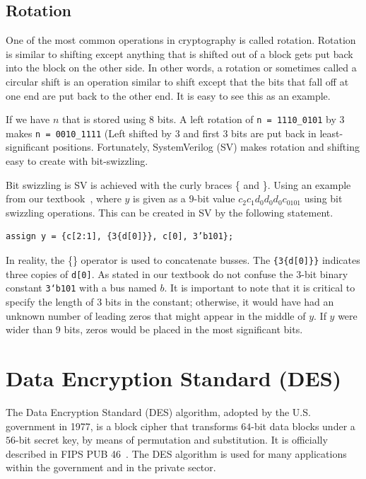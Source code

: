 \documentclass{article}
\begin{document}
\subsection{Rotation}

One of the most common operations in cryptography is called rotation.
Rotation is similar to shifting except anything that is shifted out of
a block gets put back into the block on the other side.  In other
words, a rotation or sometimes called a circular shift is an operation
similar to shift except that the bits that fall off at one end are put
back to the other end.  It is easy to see this as an example.

If we have $n$ that is stored using $8$ bits.
A left rotation of \verb!n = 1110_0101! by $3$ makes
\verb!n = 0010_1111! (Left shifted by 3 and first 3 bits are put back
in least-significant positions.  Fortunately, SystemVerilog (SV) makes
rotation and shifting easy to create with bit-swizzling.

Bit swizzling is SV is achieved with the curly braces \{ and \}.
Using an example from our textbook~\cite{ddca-riscv}, where $y$ is
given as a $9$-bit value
$c_2c_1d_0d_0d_0c_0101$ using bit swizzling operations.  This can be
created in SV by the following statement.
\begin{verbatim}
assign y = {c[2:1], {3{d[0]}}, c[0], 3’b101};
\end{verbatim}
In reality, the \{\} operator is used to concatenate busses. The
\verb!{3{d[0]}}! indicates three copies of \verb!d[0]!.
As stated in our textbook do not confuse the $3$-bit binary constant
\verb!3‘b101! with a bus named $b$.
It is important to note that it is critical to specify the length of
$3$ bits in the constant; otherwise, it would have had an unknown
number of leading zeros that might appear in the middle of $y$.
If $y$ were wider than $9$ bits, zeros would be placed in the most
significant bits.

\section{Data Encryption Standard (DES)}

The Data Encryption Standard (DES) algorithm, adopted by the U.S. 
government in 1977, is a block cipher that transforms $64$-bit data
blocks
under a $56$-bit secret key, by means of permutation and
substitution. It
is officially described in FIPS PUB 46~\cite{fips463}. The DES
algorithm is used for
many applications within the government and in the private sector.
\end{document}
